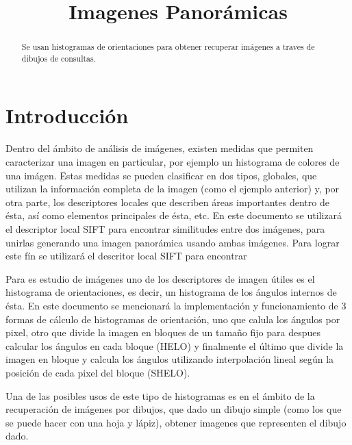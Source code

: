 \documentclass[conference]{IEEEtran}
\begin{document}
\title{Imagenes Panorámicas}
\author{
}


\maketitle

\begin{abstract}
    Se usan histogramas de orientaciones para obtener recuperar imágenes a traves de dibujos de consultas.
\end{abstract}
 

\section*{Introducción} %
    Dentro del ámbito de análisis de imágenes, existen medidas que permiten caracterizar una imagen en particular, por ejemplo un histograma de colores de una imágen. Ëstas medidas se pueden clasificar en dos tipos, globales, que utilizan la información completa de la imagen (como el ejemplo anterior) y, por otra parte, los descriptores locales que describen áreas importantes dentro de ésta, así como elementos principales de ésta, etc.
    En este documento se utilizará el descriptor local SIFT para encontrar similitudes entre dos imágenes, para unirlas generando una imagen panorámica usando ambas imágenes.
    Para lograr este fín se utilizará el descritor local SIFT para encontrar 
    

    Para es estudio de imágenes uno de los descriptores de imagen útiles es el histograma de orientaciones, es decir, un histograma de los ángulos internos de ésta. En este documento se mencionará la implementación y funcionamiento de 3 formas de cálculo de histogramas de orientación, uno que calula los ángulos por pixel, otro que divide la imagen en bloques de un tamaño fijo para despues calcular los ángulos en cada bloque (HELO) y finalmente el último que divide la imagen en bloque y calcula los ángulos utilizando interpolación lineal según la posición de cada pixel del bloque (SHELO).
    
    Una de las posibles usos de este tipo de histogramas es en el ámbito de la recuperación de imágenes por dibujos, que dado un dibujo simple (como los que se puede hacer con una hoja y lápiz), obtener imagenes que representen el dibujo dado.
    
\end{document}
